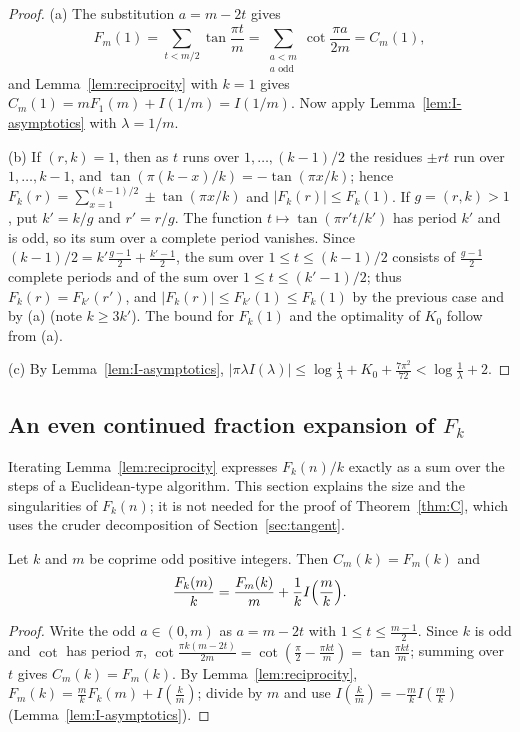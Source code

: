 \begin{proof}
(a) The substitution $a=m-2t$ gives
\[
F_m(1)=\sum_{t<m/2}\tan\frac{\pi t}m=\sum_{\substack{a<m\\ a\text{ odd}}}\cot\frac{\pi a}{2m}=C_m(1),
\]
and Lemma~\ref{lem:reciprocity} with $k=1$ gives $C_m(1)=mF_1(m)+I(1/m)=I(1/m)$. Now apply Lemma~\ref{lem:I-asymptotics} with $\lambda=1/m$.

(b) If $(r,k)=1$, then as $t$ runs over $1,\dots,(k-1)/2$ the residues $\pm rt$ run over $1,\dots,k-1$, and $\tan(\pi(k-x)/k)=-\tan(\pi x/k)$; hence $F_k(r)=\sum_{x=1}^{(k-1)/2}\pm\tan(\pi x/k)$ and $|F_k(r)|\le F_k(1)$. If $g=(r,k)>1$, put $k'=k/g$ and $r'=r/g$. The function $t\mapsto\tan(\pi r't/k')$ has period $k'$ and is odd, so its sum over a complete period vanishes. Since $(k-1)/2=k'\frac{g-1}2+\frac{k'-1}2$, the sum over $1\le t\le(k-1)/2$ consists of $\frac{g-1}2$ complete periods and of the sum over $1\le t\le(k'-1)/2$; thus $F_k(r)=F_{k'}(r')$, and $|F_k(r)|\le F_{k'}(1)\le F_k(1)$ by the previous case and by (a) (note $k\ge3k'$). The bound for $F_k(1)$ and the optimality of $K_0$ follow from (a).

(c) By Lemma~\ref{lem:I-asymptotics}, $|\pi\lambda I(\lambda)|\le\log\frac1\lambda+K_0+\frac{7\pi^2}{72}<\log\frac1\lambda+2$.
\end{proof}

\subsection{An even continued fraction expansion of \texorpdfstring{$F_k$}{Fk}}\label{subsec:even-cf}
Iterating Lemma~\ref{lem:reciprocity} expresses $F_k(n)/k$ exactly as a sum over the steps of a Euclidean-type algorithm. This section explains the size and the singularities of $F_k(n)$; it is not needed for the proof of Theorem~\ref{thm:C}, which uses the cruder decomposition of Section~\ref{sec:tangent}.

\begin{lemma}\label{lem:odd-reciprocity}
Let $k$ and $m$ be coprime odd positive integers. Then $C_m(k)=F_m(k)$ and
\[
\frac{F_k(m)}k=\frac{F_m(k)}m+\frac1kI\Bigl(\frac mk\Bigr).
\]
\end{lemma}

\begin{proof}
Write the odd $a\in(0,m)$ as $a=m{-}2t$ with $1\le t\le\frac{m-1}2$. Since $k$ is odd and $\cot$ has period $\pi$, $\cot\frac{\pi k(m-2t)}{2m}=\cot(\frac{\pi}2-\frac{\pi kt}m)=\tan\frac{\pi kt}m$; summing over $t$ gives $C_m(k)=F_m(k)$. By Lemma~\ref{lem:reciprocity}, $F_m(k)=\frac mkF_k(m)+I(\frac km)$; divide by $m$ and use $I(\frac km)=-\frac mkI(\frac mk)$ (Lemma~\ref{lem:I-asymptotics}).
\end{proof}

